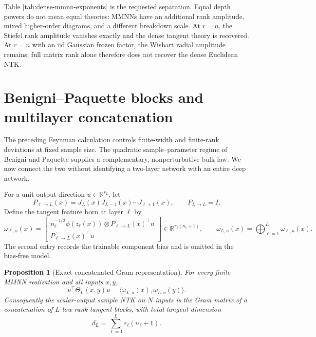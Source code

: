\documentclass{article}
\newtheorem{proposition}[theorem]{Proposition}
\newcommand{\R}{\mathbb R}
\begin{document}
Table \ref{tab:dense-mmnn-exponents} is the requested separation.  Equal
depth powers do not mean equal theories: MMNNs have an additional rank
amplitude, mixed higher-order diagrams, and a different breakdown scale.  At
\(r=n\), the Stiefel rank amplitude vanishes exactly and the dense tangent
theory is recovered.  At \(r=n\) with an iid Gaussian frozen factor, the
Wishart radial amplitude remains; full matrix rank alone therefore does not
recover the dense Euclidean NTK.

\section{Benigni--Paquette blocks and multilayer concatenation}
\label{sec:bp-concatenation}

The preceding Feynman calculation controls finite-width and finite-rank
deviations at fixed sample size.  The quadratic sample--parameter regime of
Benigni and Paquette \citep{BenigniPaquette2025} supplies a complementary,
nonperturbative bulk
law.  We now connect the two without identifying a two-layer network with an
entire deep network.

For a unit output direction \(u\in\R^{r_L}\), let
\begin{equation}
P_{\ell\to L}(x)=J_L(x)J_{L-1}(x)\cdots J_{\ell+1}(x),
\qquad P_{L\to L}=I.
\label{eq:downstream-transport}
\end{equation}
Define the tangent feature born at layer \(\ell\) by
\begin{equation}
\omega_{\ell,u}(x)=
\begin{bmatrix}
n_\ell^{-1/2}\phi(z_\ell(x))\otimes P_{\ell\to L}(x)^\top u\\
P_{\ell\to L}(x)^\top u
\end{bmatrix}
\in\R^{r_\ell(n_\ell+1)},
\qquad
\omega_{L,u}(x)=\bigoplus_{\ell=1}^L\omega_{\ell,u}(x).
\label{eq:concatenated-tangent-feature}
\end{equation}
The second entry records the trainable component bias and is omitted in the
bias-free model.

\begin{proposition}[Exact concatenated Gram representation]
\label{prop:concatenated-gram}
For every finite MMNN realization and all inputs \(x,y\),
\begin{equation}
u^\top\Theta_L(x,y)u
=\langle\omega_{L,u}(x),\omega_{L,u}(y)\rangle.
\label{eq:mmnn-concatenated-gram}
\end{equation}
Consequently the scalar-output sample NTK on \(N\) inputs is the Gram matrix
of a concatenation of \(L\) low-rank tangent blocks, with total tangent
dimension
\begin{equation}
d_L=\sum_{\ell=1}^L r_\ell(n_\ell+1).
\label{eq:total-tangent-dimension}
\end{equation}
\end{proposition}
\end{document}
